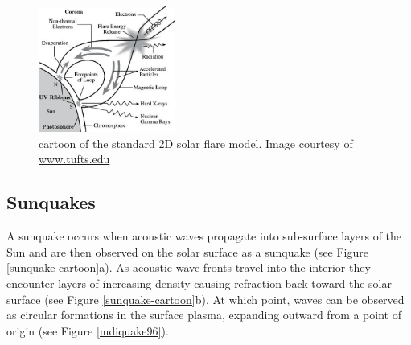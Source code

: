 \begin{figure}[H]
  \begin{center}
  \includegraphics[width=0.40\textwidth]{flare}
  \caption{cartoon of the standard 2D solar flare model. Image courtesy of \href{http://ase.tufts.edu/cosmos/print_images.asp?id=47}{www.tufts.edu}}\label{flare-cartoon}
\end{center}
\end{figure}





\subsection{Sunquakes}
A sunquake occurs when acoustic waves propagate into sub-surface layers of the Sun 
and are then observed on the solar surface as a sunquake (see Figure \ref{sunquake-cartoon}a). As acoustic wave-fronts travel into the interior they encounter layers of increasing density causing refraction back toward the solar surface (see Figure \ref{sunquake-cartoon}b). At which point, waves can be observed as circular formations in the surface plasma, expanding outward from a point of origin (see Figure \ref{mdiquake96}).


